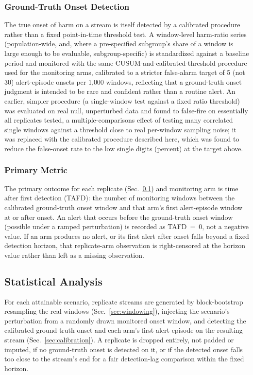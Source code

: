 \documentclass[preprintsapa,article,submit,oneauthor]{Definitions/mdpi}
\begin{document}
\subsubsection{Ground-Truth Onset Detection}

The true onset of harm on a stream is itself detected by a calibrated procedure rather than a fixed point-in-time threshold test. A window-level harm-ratio series (population-wide, and, where a pre-specified subgroup's share of a window is large enough to be evaluable, subgroup-specific) is standardized against a baseline period and monitored with the same CUSUM-and-calibrated-threshold procedure used for the monitoring arms, calibrated to a stricter false-alarm target of 5 (not 30) alert-episode onsets per 1{,}000 windows, reflecting that a ground-truth onset judgment is intended to be rare and confident rather than a routine alert. An earlier, simpler procedure (a single-window test against a fixed ratio threshold) was evaluated on real null, unperturbed data and found to false-fire on essentially all replicates tested, a multiple-comparisons effect of testing many correlated single windows against a threshold close to real per-window sampling noise; it was replaced with the calibrated procedure described here, which was found to reduce the false-onset rate to the low single digits (percent) at the target above.

\subsubsection{Primary Metric}

The primary outcome for each replicate (Sec.~\ref{sec:stats}) and monitoring arm is time after first detection (TAFD): the number of monitoring windows between the calibrated ground-truth onset window and that arm's first alert-episode window at or after onset. An alert that occurs before the ground-truth onset window (possible under a ramped perturbation) is recorded as TAFD~=~0, not a negative value. If an arm produces no alert, or its first alert after onset falls beyond a fixed detection horizon, that replicate-arm observation is right-censored at the horizon value rather than left as a missing observation.

\subsection{Statistical Analysis}\label{sec:stats}

For each attainable scenario, replicate streams are generated by block-bootstrap resampling the real windows (Sec.~\ref{sec:windowing}), injecting the scenario's perturbation from a randomly drawn monitored onset window, and detecting the calibrated ground-truth onset and each arm's first alert episode on the resulting stream (Sec.~\ref{sec:calibration}). A replicate is dropped entirely, not padded or imputed, if no ground-truth onset is detected on it, or if the detected onset falls too close to the stream's end for a fair detection-lag comparison within the fixed horizon.
\end{document}
